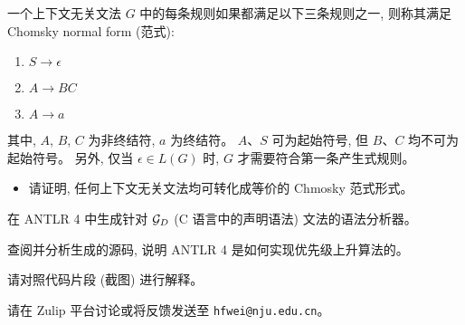 \documentclass[a4paper, justified]{tufte-handout}
\begin{document}
\begin{solution}
\end{solution}

\beginoptional

\begin{problem}
  一个上下文无关文法 $G$ 中的每条规则如果都满足以下三条规则之一,
  则称其满足 Chomsky normal form (范式):
  \begin{enumerate}[(1)]
    \item $S \to \epsilon$
    \item $A \to BC$
    \item $A \to a$
  \end{enumerate}
  其中, $A$, $B$, $C$ 为非终结符, $a$ 为终结符。
  $A$、$S$ 可为起始符号, 但 $B$、$C$ 均不可为起始符号。
  另外, 仅当 $\epsilon \in L(G)$ 时, $G$ 才需要符合第一条产生式规则。
  \begin{itemize}
    \item 请证明, 任何上下文无关文法均可转化成等价的 Chmosky 范式形式。
  \end{itemize}
\end{problem}

\begin{solution}
\end{solution}

\pagebreak
\begin{problem}
  在 ANTLR 4 中生成针对 $\mathcal{G}_{D}$ (C 语言中的声明语法)
  文法的语法分析器。

  \noindent 查阅并分析生成的源码, 说明 ANTLR 4 是如何实现优先级上升算法的。

  \noindent 请对照代码片段 (截图) 进行解释。
\end{problem}

\begin{solution}
\end{solution}



\beginfb

请在 Zulip 平台讨论或将反馈发送至 \texttt{hfwei@nju.edu.cn}。
\end{document}
